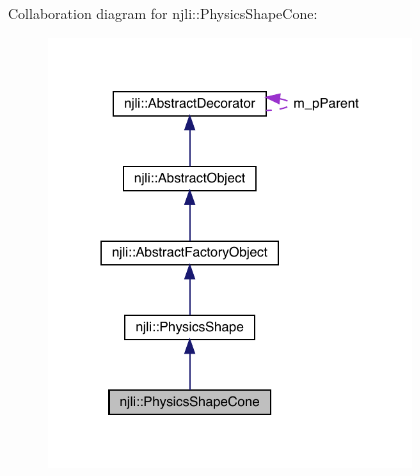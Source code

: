 Collaboration diagram for njli\+:\+:Physics\+Shape\+Cone\+:\nopagebreak
\begin{figure}[H]
\begin{center}
\leavevmode
\includegraphics[width=273pt]{classnjli_1_1_physics_shape_cone__coll__graph}
\end{center}
\end{figure}
